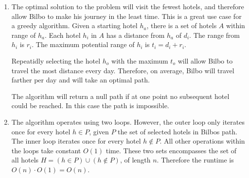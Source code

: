 \documentclass{article}
\begin{document}
\begin{enumerate}[label=(\alph*)]
    \item The optimal solution to the problem will visit the fewest hotels,
        and therefore allow Bilbo to make his journey in the least time.
        This is a great use case for a greedy algorithm.
        Given a starting hotel $h_a$, there is a set of hotels $A$
        within range of $h_a$. Each hotel $h_i$ in $A$ has a distance from
        $h_a$ of $d_i$. The range from $h_i$ is $r_i$. The maximum potential
        range of $h_i$ is $t_i = d_i + r_i$.

        Repeatidly selecting the hotel $h_o$ with the maximum $t_o$ will allow
        Bilbo to travel the most distance every day.
        Therefore, on average, Bilbo will travel farther per day and will
        take an optimal path.

        The algorithm will return a null path if at one point no subsequent
        hotel could be reached. In this case the path is impossible.

    \item The algorithm operates using two loops. However, the outer
        loop only iterates once for every hotel $h \in P$,
        given $P$ the set of selected hotels in Bilbos path.
        The inner loop iterates once for every hotel $h \notin P$.
        All other operations within the loops take constant $O(1)$ time.
        These two sets encompasses the set of all hotels
        $H = (h \in P) \cup (h \notin P)$, of length $n$.
        Therefore the runtime is $O(n) \cdot O(1) = O(n)$.
\end{enumerate}
\end{document}
